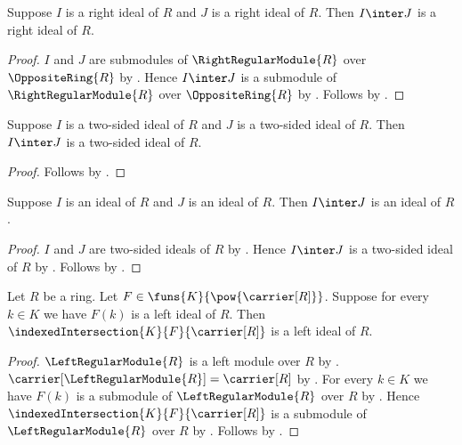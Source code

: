 \begin{theorem}\label{right_ideal_intersection}
    Suppose $I$ is a right ideal of $R$ and $J$ is a right ideal of $R$.
    Then $I\inter J$ is a right ideal of $R$.
\end{theorem}
\begin{proof}
    $I$ and $J$ are submodules of $\RightRegularModule{R}$ over
        $\OppositeRing{R}$ by
        .
    Hence $I\inter J$ is a submodule of $\RightRegularModule{R}$ over
        $\OppositeRing{R}$ by .
    Follows by .
\end{proof}

\begin{theorem}\label{two_sided_ideal_intersection}
    Suppose $I$ is a two-sided ideal of $R$ and
        $J$ is a two-sided ideal of $R$.
    Then $I\inter J$ is a two-sided ideal of $R$.
\end{theorem}
\begin{proof}
    Follows by
        .
\end{proof}

\begin{corollary}\label{ideal_intersection}
    Suppose $I$ is an ideal of $R$ and $J$ is an ideal of $R$.
    Then $I\inter J$ is an ideal of $R$.
\end{corollary}
\begin{proof}
    $I$ and $J$ are two-sided ideals of $R$ by .
    Hence $I\inter J$ is a two-sided ideal of $R$ by
        .
    Follows by .
\end{proof}

\begin{theorem}\label{left_ideal_indexed_intersection}
    Let $R$ be a ring.
    Let $F\in\funs{K}{\pow{\carrier[R]}}$.
    Suppose for every $k\in K$ we have $F(k)$ is a left ideal of $R$.
    Then $\indexedIntersection{K}{F}{\carrier[R]}$
        is a left ideal of $R$.
\end{theorem}
\begin{proof}
    $\LeftRegularModule{R}$ is a left module over $R$ by
        .
    $\carrier[\LeftRegularModule{R}]=\carrier[R]$ by
        .
    For every $k\in K$ we have
        $F(k)$ is a submodule of $\LeftRegularModule{R}$ over $R$ by
        .
    Hence $\indexedIntersection{K}{F}{\carrier[R]}$
        is a submodule of $\LeftRegularModule{R}$ over $R$ by
        .
    Follows by .
\end{proof}

